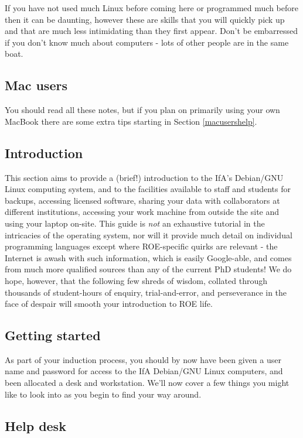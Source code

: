 If you have not used much Linux before coming here or programmed much before then it can be daunting, however these are skills that you will quickly pick up and that are much less intimidating than they first appear. Don't be embarressed if you don't know much about computers - lots of other people are in the same boat.

\subsection*{Mac users}
You should read all these notes, but if you plan on primarily using your own MacBook there are some extra tips starting in Section \ref{macusershelp}.

\subsection{Introduction}
This section aims to provide a (brief!) introduction to the IfA's Debian/GNU Linux computing system, and to the facilities available to staff and students for backups, accessing licensed software, sharing your data with collaborators at different institutions, accessing your work machine from outside the site and using your laptop on-site. This guide is \textit{not} an exhaustive tutorial in the intricacies of the operating system, nor will it provide much detail on individual programming languages except where ROE-specific quirks are relevant - the Internet is awash with such information, which is easily Google-able, and comes from much more qualified sources than any of the current PhD students! We do hope, however, that the following few shreds of wisdom, collated through thousands of student-hours of enquiry, trial-and-error, and perseverance in the face of despair will smooth your introduction to ROE life.

\subsection{Getting started}
As part of your induction process, you should by now have been given a user name and password for access to the IfA Debian/GNU Linux computers, and been allocated a desk and workstation. We'll now cover a few things you might like to look into as you begin to find your way around.

\subsection{Help desk}

